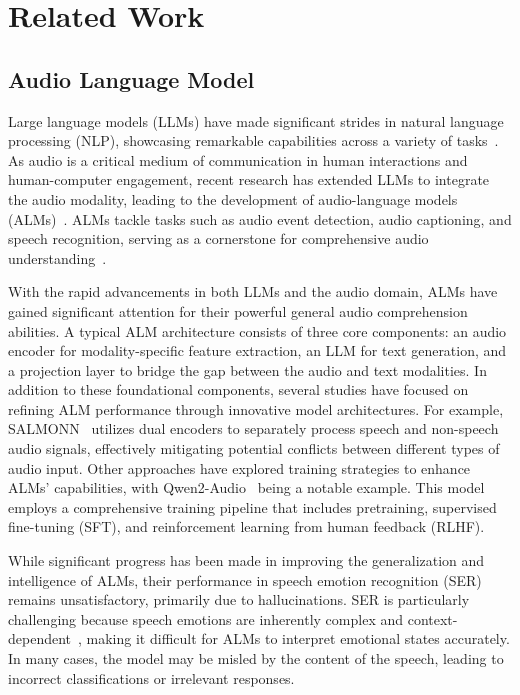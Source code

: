 \section{Related Work}
\subsection{Audio Language Model}

Large language models (LLMs) have made significant strides in natural language processing (NLP), showcasing remarkable capabilities across a variety of tasks~\cite{LLMsurvey}. As audio is a critical medium of communication in human interactions and human-computer engagement, recent research has extended LLMs to integrate the audio modality, leading to the development of audio-language models (ALMs)~\cite{alm_AudioBench}. ALMs tackle tasks such as audio event detection, audio captioning, and speech recognition, serving as a cornerstone for comprehensive audio understanding~\cite{qwenaudio}.

With the rapid advancements in both LLMs and the audio domain, ALMs have gained significant attention for their powerful general audio comprehension abilities. A typical ALM architecture consists of three core components: an audio encoder for modality-specific feature extraction, an LLM for text generation, and a projection layer to bridge the gap between the audio and text modalities. In addition to these foundational components, several studies have focused on refining ALM performance through innovative model architectures. For example, SALMONN~\cite{SALMONN} utilizes dual encoders to separately process speech and non-speech audio signals, effectively mitigating potential conflicts between different types of audio input. Other approaches have explored training strategies to enhance ALMs' capabilities, with Qwen2-Audio~\cite{Qwen2-Audio} being a notable example. This model employs a comprehensive training pipeline that includes pretraining, supervised fine-tuning (SFT), and reinforcement learning from human feedback (RLHF).

While significant progress has been made in improving the generalization and intelligence of ALMs, their performance in speech emotion recognition (SER) remains unsatisfactory, primarily due to hallucinations. SER is particularly challenging because speech emotions are inherently complex and context-dependent~\cite{alm_AIR-Bench}, making it difficult for ALMs to interpret emotional states accurately. In many cases, the model may be misled by the content of the speech, leading to incorrect classifications or irrelevant responses.

